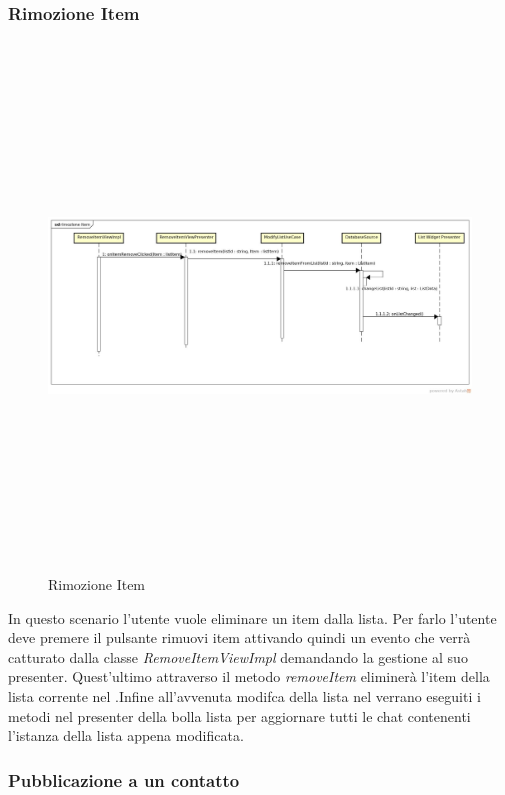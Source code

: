 \subsubsection{Rimozione Item}

\label{Rimozione Item }
\begin{figure}[H]
	\centering
	\includegraphics[width=16cm, height=14cm]{Sezioni/Diagrammi/img_app/rimozione_item.jpg}
	\caption{Rimozione Item}
	
\end{figure}
In questo scenario l'utente vuole eliminare un item dalla lista. Per farlo l'utente deve premere il pulsante rimuovi item attivando quindi un evento che verrà catturato dalla classe \textit{RemoveItemViewImpl} demandando la gestione al suo presenter. Quest'ultimo attraverso il metodo \textit{removeItem} eliminerà l'item della lista corrente nel .Infine all'avvenuta modifca della lista nel  verrano eseguiti i metodi nel presenter della bolla lista per aggiornare tutti le chat contenenti l'istanza della lista appena modificata.  
\newpage

\subsubsection{Pubblicazione a un contatto}

